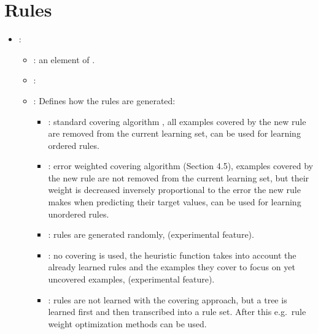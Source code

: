 \section{Rules}

\begin{itemize}
    \item {}:
           \begin{itemize}
                \item \optionPossibleValues{}: an element of .
                \item \optionDefaultValue{}: 
                \item \optionDescrption{}:  Defines how the rules are generated:
                \begin{itemize}
                    \item {}: standard covering algorithm \cite{Michalski1969}, all examples covered by the new rule are removed from the current learning set, can be used for learning ordered rules.
                    \item {}: error weighted covering algorithm \cite{Zenko07} (Section 4.5), examples covered by the new rule are not removed from the current learning set, but their weight is decreased inversely proportional to the error the new rule makes when predicting their target values, can be used for learning unordered rules.
                    \item {}: rules are generated randomly, (experimental feature).
                    \item {}: no covering is used, the heuristic function takes into account the already learned rules and the examples they cover to focus on yet uncovered examples, (experimental feature).
                    \item {}: rules are not learned with the covering approach, but a tree is learned first and then transcribed into a rule set. After this e.g.\ rule weight optimization methods can be used.

\end{itemize}
\end{itemize}
\end{itemize}

